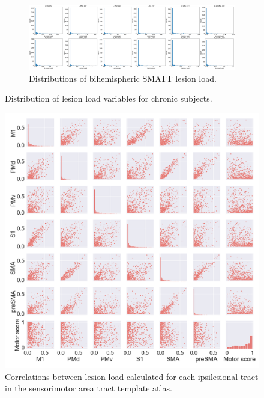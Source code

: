 \documentclass[10pt]{article}
\begin{document}
\begin{figure}
\begin{subfigure}{1\textwidth}
  \centering
  \includegraphics[width=1\linewidth]{figures/all2h_lesionload.png}
  \caption{Distributions of bihemispheric SMATT lesion load.}
  \label{fig:sfig2}
\end{subfigure}
\caption{Distribution of lesion load variables for chronic subjects.}
\label{lesion_load_dist}
\end{figure}


\begin{figure}[ht]
\centering
\includegraphics[width=0.8\linewidth]{figures/SMATT_scatterplts.png}
\caption{Correlations between lesion load calculated for each ipsilesional tract in the sensorimotor area tract template atlas.}
\label{smatt_pairwise_correlations}
\end{figure}
\end{document}
